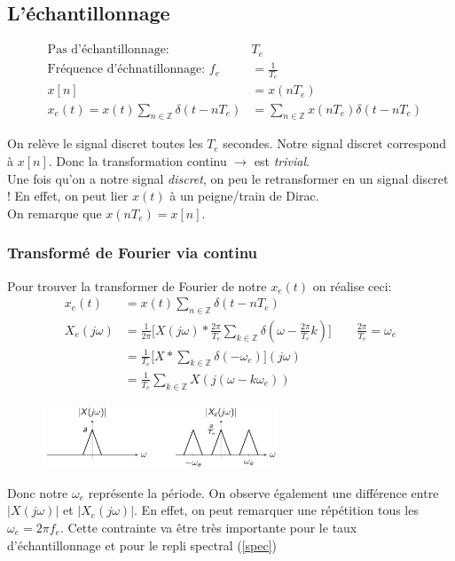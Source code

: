 \documentclass{report}
\begin{document}
\subsection{L'échantillonnage}
\begin{figure}
\centering
\begin{align*}
\text{Pas d'échantillonnage: } &T_e\\
\text{Fréquence d'échnatillonnage: }  f_e &= \frac{1}{T_e}\\
x[n] &= x(nT_e)\\
x_e(t)=x(t) \sum_{n \in \mathbb{Z}} \delta(t-nT_e)&= \sum_{n \in \mathbb{Z}} x(nT_e)\delta(t-nT_e)
\end{align*}
\end{figure}
On relève le signal discret toutes les $T_e$ secondes. Notre signal discret correspond à $x[n]$. Donc la transformation continu $\rightarrow$ est \textit{trivial}.\\
Une fois qu'on a notre signal \textit{discret}, on peu le retransformer en un signal discret ! En effet, on peut lier $x(t)$ à un peigne/train de Dirac.\\
On remarque que $x(nT_e) = x[n]$.

\subsubsection{Transformé de Fourier via continu}
Pour trouver la transformer de Fourier de notre $x_e(t)$ on réalise ceci:
\begin{align*}
x_e(t)&= x(t) \sum_{n \in \mathbb{Z}} \delta(t-nT_e)\\
X_e(j\omega) &= \frac{1}{2\pi} \Bigr[ X(j\omega) \ast \frac{2\pi}{T_e} \sum_{k \in \mathbb{Z}} \delta(\omega- \frac{2\pi}{T_e}k) \Big] \qquad  \frac{2\pi}{T_e} = \omega_e\\
&= \frac{1}{T_e} \Bigr[ X \ast \sum_{k \in \mathbb{Z}} \delta(-\omega_e) \Bigr](j\omega)\\
&= \frac{1}{T_e} \sum_{k \in \mathbb{Z}} X(j(\omega -k \omega_e))
\end{align*}
\newpage
\begin{figure}
\centering
\includegraphics[width=7cm]{img/rep.png}
\end{figure}
Donc notre $\omega_e$ représente la période. On observe également une différence entre $|X(j\omega)|$ et $|X_e(j\omega)|$. En effet, on peut remarquer une répétition tous les $\omega_e = 2 \pi f_e$. Cette contrainte va être très importante pour le taux d'échantillonnage et pour le repli spectral (\ref{spec})
\end{document}

